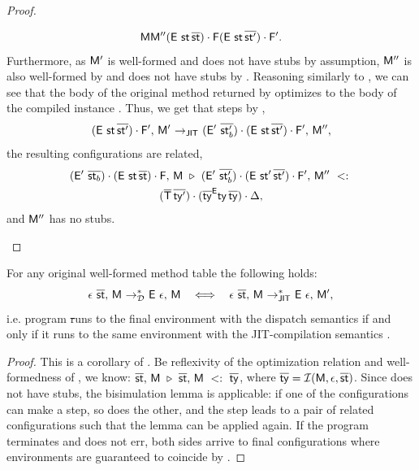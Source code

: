 {\begin{proof}
{\begin{itemize}
\[            {\mathsf{M}}{\mathsf{M}''}
            {(\mathsf{E}\ \mathsf{st}\,\overline{\mathsf{st} }) \cdot \mathsf{F} }
            {(\mathsf{E}\ \mathsf{st}\,\overline{\mathsf{st}'}) \cdot \mathsf{F}'}.
      \]
      Furthermore, as $\mathsf{M}'$ is well-formed and does not have stubs
      by assumption, $\mathsf{M}''$ is also well-formed by 
      and does not have stubs by .
      Reasoning similarly to , we can see that
      the body  of the original method returned by
      \dispatch{\mtbl}{\m}{\ol\Ty} optimizes to the body 
      of the compiled instance \msig\m{\ol\Ty}. Thus, we get that
       steps by ,
      \[
        \config{\stk{(\env\ \st\,\ol{\st'})}{\frm'}}{\mtbl'} \stepj
        \config{\stk{(\env'\ \ol{\st'_b})}{\stk{(\env\ \st\,\ol{\st'})}{\frm'}}}{\mtbl''},
      \]
      the resulting configurations are related,
      \begin{multline*}
        \optconfig
          {\stk{(\env'\ \ol{\st_b })}{\stk{(\env\ \st \,\ol{\st })}{\frm }}}
          {\mtbl}
          {\stk{(\env'\ \ol{\st'_b})}{\stk{(\env\ \st'\,\ol{\st'})}{\frm'}}}
          {\mtbl''}
          \\
          {\stk{(\ol\Ty\,\ol{\ty'})}{\stk{(\ol\ty^\env \ty\,\ol\ty)}{\Delta}}},
      \end{multline*}
      and $\mathsf{M}''$ has no stubs.
  \end{itemize}
}
\end{proof}

\begin{theorem}\label{thm:disp-jit-equiv}
  For any original well-formed method table \mtbl the following holds:
  \[
    \config{\done\ \ol\st}{\mtbl} \stepdmul \config{\env\ \done}{\mtbl}
    \ \ \iff\ \
    \config{\done\ \ol\st}{\mtbl} \stepjmul \config{\env\ \done}{\mtbl'},
  \]
  i.e. program \ol\st runs to the final environment \env with the dispatch
  semantics \stepd if and only if it runs to the same environment with
  the JIT-compilation semantics \stepj.
\end{theorem}
\begin{proof}
  This is a corollary of . Be reflexivity of the
  optimization relation and well-formedness of \mtbl, we know:
  $\overline{\mathsf{st}},\, \mathsf{M}\ \triangleright\ \overline{\mathsf{st}},\, \mathsf{M}\ <:\ \overline{\mathsf{ty}}$,
  where $\overline{\mathsf{ty}} = \operatorname{\mathcal{I}}(\mathsf{M}, \epsilon, \overline{\mathsf{st}})$. Since \mtbl does not have
  stubs, the bisimulation lemma is applicable: if one of the configurations can
  make a step, so does the other, and the step leads to a pair of related
  configurations such that the lemma can be applied again. If the program
  terminates and does not err,
  both sides arrive to final configurations where environments are
  guaranteed to coincide by \SC{O-Stack}.
\end{proof}

}

